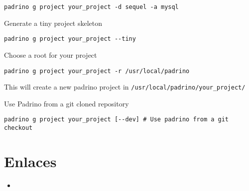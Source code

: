 \begin{verbatim}
padrino g project your_project -d sequel -a mysql
\end{verbatim}
Generate a tiny project skeleton

\begin{verbatim}
padrino g project your_project --tiny
\end{verbatim}
Choose a root for your project

\begin{verbatim}
padrino g project your_project -r /usr/local/padrino
\end{verbatim}
This will create a new padrino project in \verb|/usr/local/padrino/your_project/|

Use Padrino from a git cloned repository

\begin{verbatim}
padrino g project your_project [--dev] # Use padrino from a git checkout
\end{verbatim}

\section{Enlaces}

\begin{itemize}
\item
{}
\end{itemize}
